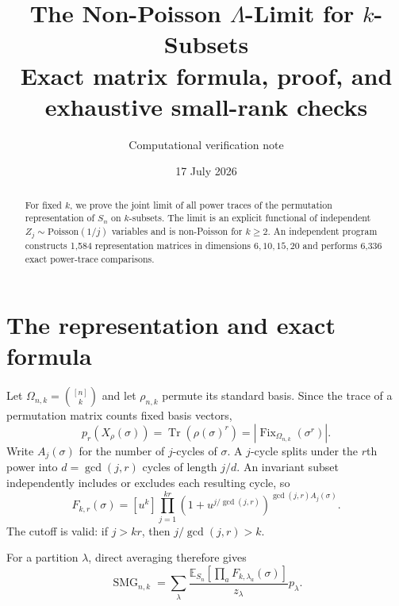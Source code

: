 \documentclass[11pt]{article}
\title{\color{navy}\bfseries The Non-Poisson $\Lambda$-Limit for $k$-Subsets\\
\large Exact matrix formula, proof, and exhaustive small-rank checks}
\author{Computational verification note}\date{17 July 2026}
\newcommand{\Fix}{\operatorname{Fix}}
\newcommand{\SMG}{\operatorname{SMG}}
\begin{document}
\maketitle

\begin{abstract}
For fixed $k$, we prove the joint limit of all power traces of the permutation
representation of $S_n$ on $k$-subsets.  The limit is an explicit functional
of independent $Z_j\sim\mathrm{Poisson}(1/j)$ variables and is non-Poisson for
$k\ge2$.  An independent program constructs 1,584 representation matrices in
dimensions $6,10,15,20$ and performs 6,336 exact power-trace comparisons.
\end{abstract}

\section{The representation and exact formula}
Let $\Omega_{n,k}=\binom{[n]}k$ and let $\rho_{n,k}$ permute its standard
basis.  Since the trace of a permutation matrix counts fixed basis vectors,
\[
 p_r(X_{\rho}(\sigma))=\operatorname{Tr}(\rho(\sigma)^r)
 =|\Fix_{\Omega_{n,k}}(\sigma^r)|.
\]
Write $A_j(\sigma)$ for the number of $j$-cycles of $\sigma$.  A $j$-cycle
splits under the $r$th power into $d=\gcd(j,r)$ cycles of length $j/d$.
An invariant subset independently includes or excludes each resulting cycle,
so
\begin{equation}\label{eq:fixed}
\boxed{F_{k,r}(\sigma)=[u^k]\prod_{j=1}^{kr}
\left(1+u^{j/\gcd(j,r)}\right)^{\gcd(j,r)A_j(\sigma)}.}
\end{equation}
The cutoff is valid: if $j>kr$, then $j/\gcd(j,r)>k$.

For a partition $\lambda$, direct averaging therefore gives
\begin{equation}\label{eq:smg}
\SMG_{n,k}=\sum_\lambda\frac{\mathbb E_{S_n}
[\prod_aF_{k,\lambda_a}(\sigma)]}{z_\lambda}p_\lambda.
\end{equation}
\end{document}
